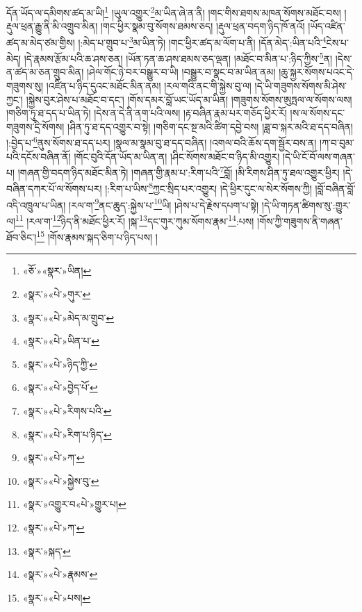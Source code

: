 དོན་ཡོད་ལ་དམིགས་ཚད་མ་ཡི།\footnote{«ཅོ་»«སྣར་»ཡིན།} །ཡུལ་འགྱུར་\footnote{«སྣར་»«པེ་»གུར་}མ་ཡིན་ཞེ་ན་ནི། །གང་གིས་ཐགས་མཁན་སོགས་མཐོང་བས། །རྡུལ་ཕྲན་རྒྱུ་ནི་མི་འགྲུབ་མིན། །གང་ཕྱིར་སྣམ་བུ་སོགས་ཐམས་ཅད། །རྡུལ་ཕྲན་བདག་ཉིད་ཁོ་ནའོ། །ཡོད་འཛིན་ཚད་མ་མེད་ཙམ་གྱིས། །:མེད་པ་གྲུབ་པ་\footnote{«སྣར་»«པེ་»མེད་མ་གྲུབ་}མ་ཡིན་ཏེ། །གང་ཕྱིར་ཚད་མ་ལོག་པ་ནི། །དོན་མེད་:ཡིན་པའི་\footnote{«སྣར་»«པེ་»ཡིན་པ་}ངེས་པ་མེད། །དེ་རྣམས་རྩོམ་པའི་ཆ་ཤས་ཅན། །ཡོན་ཏན་ཆ་ཤས་ཐམས་ཅད་ལྡན། །མཐོང་བ་མིན་པ་:ཉིད་ཀྱིས་\footnote{«སྣར་»«པེ་»ཉིད་ཀྱི་}ན། །དེས་ན་ཚད་མ་ཅན་གྲུབ་མིན། །ཤེལ་གོང་ཉེ་བར་བསྒྱུར་བ་ཡི། །བསྒྱུར་བ་སྣང་བ་མ་ཡིན་ནམ། །ཆུ་སྐྱར་སོགས་པའང་དེ་གཟུགས་སུ། །འཛིན་པ་ཉིད་དུའང་མཐོང་མིན་ནམ། །རལ་གའི་ནང་གི་སྐྱེས་བུ་ལ། །དེ་ཡི་གཟུགས་སོགས་མི་ཤེས་ཀྱང་། །སྐྱེས་བུར་ཤེས་པ་མཐོང་བ་དང་། །གོས་དམར་བློ་ཡང་ཡོད་མ་ཡིན། །གཟུགས་སོགས་ཨུཏྤལ་ལ་སོགས་ལས། །གཅིག་ཏུ་ཐ་དད་པ་ཡིན་ཏེ། །དེས་ན་དེ་ནི་ནག་པའི་ལས། །རྟ་བཞིན་རྣམ་པར་གཅོད་ཕྱིར་རོ། །ས་ལ་སོགས་དང་གཟུགས་དྲི་སོགས། །ཤིན་ཏུ་ཐ་དད་འགྱུར་བ་སྟེ། །གཅིག་དང་སྔ་མའི་ཚིག་དབྱེ་བས། །ཟླ་བ་སྐར་མའི་ཐ་དད་བཞིན། །:བྱེད་པ་\footnote{«སྣར་»«པེ་»བྱེད་པོ་}ནུས་སོགས་ཐ་དད་པར། །སྣལ་མ་སྣམ་བུ་ཐ་དད་བཞིན། །འགལ་བའི་ཆོས་དག་སྦྱོར་བས་ན། །ཀ་བ་བུམ་པའི་དངོས་བཞིན་ནོ། །གོང་བུའི་དོན་ཡོད་མ་ཡིན་ན། །ཤིང་སོགས་མཐོང་བ་ཉིད་མི་འགྱུར། །དེ་ཡི་ངོ་བོ་ལས་གཞན་པ། །གཞན་གྱི་བདག་ཉིད་མཐོང་མིན་ཏེ། །གཞན་གྱི་རྣམ་པ་:རིག་པའི་\footnote{«སྣར་»«པེ་»རིགས་པའི་}བློ། །མི་རིགས་ཤིན་ཏུ་ཐལ་འགྱུར་ཕྱིར། །དེ་བཞིན་དཀར་པོ་ལ་སོགས་པར། །:རིག་པ་ཡིས་\footnote{«སྣར་»«པེ་»རིག་པ་ཉིད་}ཀྱང་སྲིད་པར་འགྱུར། །དེ་ཕྱིར་དུང་ལ་སེར་སོགས་ཀྱི། །བློ་བཞིན་བློ་འདི་འཁྲུལ་པ་ཡིན། །རལ་ག་\footnote{«སྣར་»«པེ་»ཀ་}ནང་ཆུད་:སྐྱེས་པ་\footnote{«སྣར་»«པེ་»སྐྱེས་བུ་}ཡི། །ཤེས་པ་དེ་རྗེས་དཔག་པ་སྟེ། །དེ་ཡི་གཏན་ཚིགས་སུ་:གྱུར་ལ།\footnote{«སྣར་»འགྱུར་བ«པེ་»གྱུར་པ།} །རལ་ག་\footnote{«སྣར་»«པེ་»ཀ་}ཉིད་ནི་མཐོང་ཕྱིར་རོ། །སྐ་\footnote{«སྣར་»སྐད་}དང་གུར་ཀུམ་སོགས་རྣམ་\footnote{«སྣར་»«པེ་»རྣམས་}:པས། །གོས་ཀྱི་གཟུགས་ནི་གཞན་ཐོབ་ཅིང་།\footnote{«སྣར་»«པེ་»པས།} །གོས་རྣམས་སྐད་ཅིག་པ་ཉིད་པས། །
